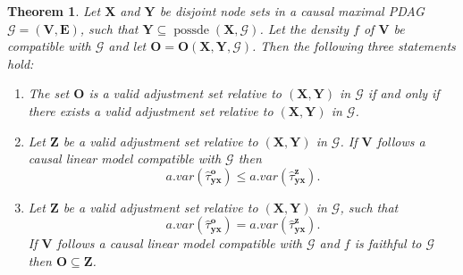 \documentclass[11pt,a4paper]{article}
\newtheorem{Theorem}[Satz]{Theorem}
\theoremstyle{definition}
\theoremstyle{remark}
\DeclareMathOperator{\Forbb}{forb}
\DeclareMathOperator{\possde}{possde}
\newcommand{\mpdag}{maximal PDAG}
\newcommand{\g}[1][G]{\mathcal{#1}}
\newcommand{\f}[2][X,Y]{\Forbb(#1,#2)}
\newcommand{\optb}[2][X,Y]{\mathbf{O}(\mathbf{#1},#2)}
\begin{document}


\begin{Theorem} \label{thm:optimalSetCPDAG}
	Let $\mathbf{X}$ and $\mathbf{Y}$ be disjoint node sets in a causal \mpdag{} $\g = (\mathbf{V},\mathbf{E})$, such that $\mathbf{Y} \subseteq \possde(\mathbf{X},\g)$. Let the density $f$ of $\mathbf{V}$ be compatible with $\g$ and let $\mathbf{O}=\optb{\g}$. Then the following three statements hold:
	\begin{enumerate}[label = (\roman*)]
		\item\label{res1-cpdag} The set $\mathbf{O}$ is a valid adjustment set relative to $(\mathbf{X,Y})$ in $\g$ if and only if there exists a valid adjustment set relative to $(\mathbf{X,Y})$ in $\g$. 
		\item\label{res2-cpdag} Let $\mathbf{Z}$ be a valid adjustment set relative to $(\mathbf{X},\mathbf{Y})$ in $\g$. If $\mathbf{V}$ follows a causal linear model compatible with $\g$ then
		\[
		a.var(\hat{\tau}^{\mathbf{o}}_{\mathbf{yx}}) \leq a.var(\hat{\tau}^{\mathbf{z}}_{\mathbf{yx}}).
		\]
		\item\label{res3-cpdag} Let $\mathbf{Z}$ be a valid adjustment set relative to $(\mathbf{X},\mathbf{Y})$ in $\g$, such that 
		\[
		a.var(\hat{\tau}^{\mathbf{o}}_{\mathbf{yx}}) = a.var(\hat{\tau}^{\mathbf{z}}_{\mathbf{yx}}).
		\]
		If $\mathbf{V}$ follows a causal linear model compatible with $\g$ and $f$ is faithful to $\g$ then $\mathbf{O}\subseteq \mathbf{Z}$. 
	\end{enumerate}
\end{Theorem}
\end{document}
